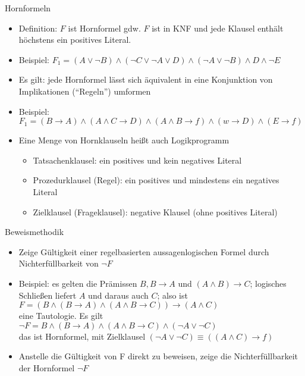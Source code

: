 \begin{frame}{Hornformeln}
	\begin{itemize}
		\item Definition: $F$ ist Hornformel gdw. $F$ ist in KNF und jede Klausel enthält höchstens ein positives Literal.
		\item Beispiel: $F_1=(A \lor \neg B) \land (\neg C \lor \neg A \lor D) \land (\neg A \lor \neg B) \land D \land \neg E$
		\item Es gilt: jede Hornformel lässt sich äquivalent in eine Konjunktion von Implikationen ("`Regeln"') umformen
		\item Beispiel: $F_1=(B \rightarrow A) \land (A \land C \rightarrow D) \land (A \land B \rightarrow f) \land (w \rightarrow D) \land (E \rightarrow f)$
		\item Eine Menge von Hornklauseln heißt auch Logikprogramm
		\begin{itemize}
			\item Tatsachenklausel: ein positives und kein negatives Literal
			\item Prozedurklausel (Regel): ein positives und mindestens ein negatives Literal
			\item Zielklausel (Frageklausel): negative Klausel (ohne positives Literal)
		\end{itemize}
	\end{itemize}
\end{frame}

\begin{frame}{Beweismethodik}
	\begin{itemize}
		\item Zeige Gültigkeit einer regelbasierten aussagenlogischen Formel durch Nichterfüllbarkeit von $\neg F$
		\item Beispiel: es gelten die Prämissen $B, B \rightarrow A$ und $(A \land B) \rightarrow C$; logisches Schließen liefert $A$ und daraus auch $C$; also ist\\
		$F=(B \land (B \rightarrow A) \land (A \land B \rightarrow C)) \rightarrow (A \land C)$\\
		eine Tautologie. Es gilt\\
		$\neg F = B \land (B \rightarrow A) \land (A \land B \rightarrow C) \land (\neg A \lor \neg C)$\\
		das ist Hornformel, mit Zielklausel $(\neg A \lor \neg C) \equiv ((A \land C) \rightarrow f)$
		\item Anstelle die Gültigkeit von F direkt zu beweisen, zeige die Nichterfüllbarkeit der Hornformel $\neg F$
	\end{itemize}
\end{frame}

